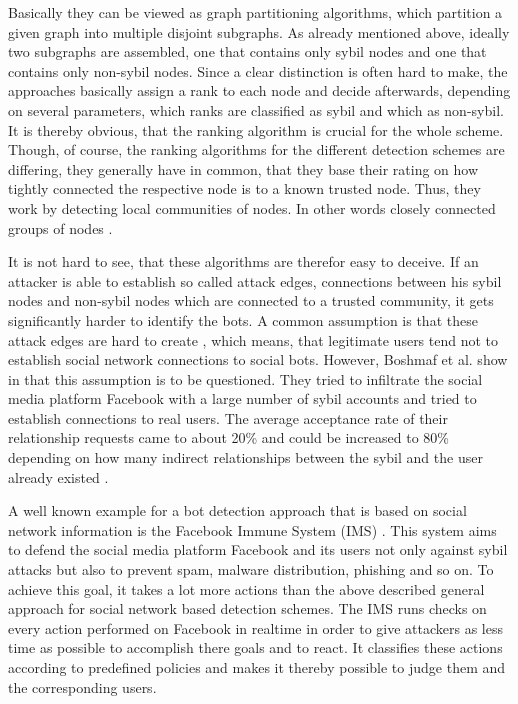 Basically they can be viewed as graph partitioning algorithms, which partition a given graph into multiple disjoint subgraphs. As already mentioned above, ideally two subgraphs are assembled, one that contains only sybil nodes and one that contains only non-sybil nodes. Since a clear distinction is often hard to make, the approaches basically assign a rank to each node and decide afterwards, depending on several parameters, which ranks are classified as sybil and which as non-sybil. It is thereby obvious, that the ranking algorithm is crucial for the whole scheme. Though, of course, the ranking algorithms for the different detection schemes are differing, they generally have in common, that they base their rating on how tightly connected the respective node is to a known trusted node. Thus, they work by detecting local communities of nodes. In other words closely connected groups of nodes \cite{comparison}.

It is not hard to see, that these algorithms are therefor easy to deceive. If an attacker is able to establish so called attack edges, connections between his sybil nodes and non-sybil nodes which are connected to a trusted community, it gets significantly harder to identify the bots. A common assumption is that these attack edges are hard to create \cite{sybilguard}, which means, that legitimate users tend not to establish social network connections to social bots. However, Boshmaf et al. show in \cite{boshmaf11} that this assumption is to be questioned. 
They tried to infiltrate the social media platform Facebook with a large number of sybil accounts and tried to establish connections to real users. The average acceptance rate of their relationship requests came to about 20\% and could be increased to 80\% depending on how many indirect relationships between the sybil and the user already existed \cite{boshmaf11}. %

A well known example for a bot detection approach that is based on social network information is the Facebook Immune System (IMS) \cite{fis}. This system aims to defend the social media platform Facebook and its users not only against sybil attacks but also to prevent spam, malware distribution, phishing and so on.  To achieve this goal, it takes a lot more actions than the above described general approach for social network based detection schemes. The IMS runs checks on every action performed on Facebook in realtime in order to give attackers as less time as possible to accomplish there goals and to react. It classifies these actions according to predefined policies and makes it thereby possible to judge them and the corresponding users.

